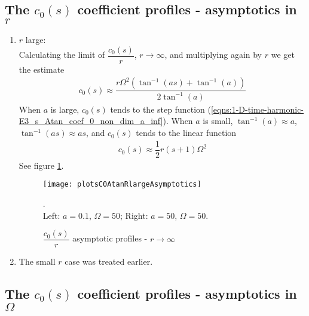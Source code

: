 \documentclass[12pt,twoside]{report}
\begin{document}
\subsection{The $c_0(s)$ coefficient profiles - asymptotics in $r$  } 

\begin{enumerate}
\item $r$ large:\\
Calculating the limit of $\dfrac{c_0(s)}{r}$, $r \rightarrow \infty$, and multiplying again by $r$ we get the estimate
	\begin{align}
	c_0(s) \approx \dfrac{r\Omega ^2 \left(\tan ^{-1}(a s)+\tan ^{-1}(a)\right)}{2 \tan ^{-1}(a)}
	\end{align}
	When $a$ is large, $c_0(s)$ tends to the step function (\ref{eqns:1-D-time-harmonic-E3_s_Atan_coef_0_non_dim_a_inf}). When $a$ is small, $\tan^{-1}(a) \approx a$, $\tan^{-1}(as) \approx as$, and $c_0(s)$ tends to the linear function 
	\begin{align}
	c_0(s) \approx \dfrac{1}{2} r (s+1) \Omega ^2
	\end{align}
See figure \ref{fig:c0AtanRlim}.	
\begin{figure} 
\begin{center}
\texttt{[image: plotsC0AtanRlargeAsymptotics]}
\end{center}
\caption {$\dfrac{c_0(s)}{r}$ asymptotic profiles - $r \rightarrow \infty$}.\\
Left: $a = 0.1$, $\Omega = 50$; Right: $a = 50$, $\Omega=50$.
\label{fig:c0AtanRlim}
\end{figure}



\item The small $r$ case was treated earlier. 
\end{enumerate}



\subsection{The $c_0(s)$ coefficient profiles - asymptotics in $\Omega$  } 
\end{document}
